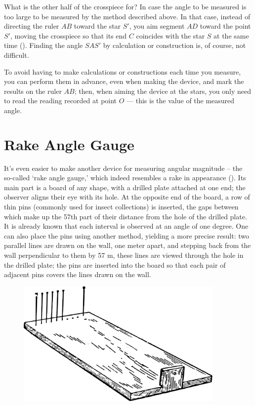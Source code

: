 What is the other half of the crosspiece for? In case the angle to be measured is too large to be measured by the method described above. In that case, instead of directing the ruler $AB$ toward the star $S'$, you aim segment $AD$ toward the point $S'$, moving the crosspiece so that its end $C$ coincides with the star $S$ at the same time (). Finding the angle $SAS'$ by calculation or construction is, of course, not difficult.

To avoid having to make calculations or constructions each time you measure, you can perform them in advance, even when making the device, and mark the results on the ruler $AB$; then, when aiming the device at the stars, you only need to read the reading recorded at point $O$ — this is the value of the measured angle.


\section{Rake Angle Gauge}
\label{sec-3.9}

It's even easier to make another device for measuring angular magnitude -- the so-called `rake angle gauge,' which indeed resembles a rake in appearance (). Its main part is a board of any shape, with a drilled plate attached at one end; the observer aligns their eye with its hole. At the opposite end of the board, a row of thin pins (commonly used for insect collections) is inserted, the gaps between which make up the 57th part of their distance from the hole of the drilled plate. It is already known that each interval is observed at an angle of one degree. One can also place the pins using another method, yielding a more precise result: two parallel lines are drawn on the wall, one meter apart, and stepping back from the wall perpendicular to them by 57 m, these lines are viewed through the hole in the drilled plate; the pins are inserted into the board so that each pair of adjacent pins covers the lines drawn on the wall.

\begin{figure}[h!]
\centering
\includegraphics[width=0.9\textwidth]{figures/ch-03/fig-071.pdf}
\end{figure}


